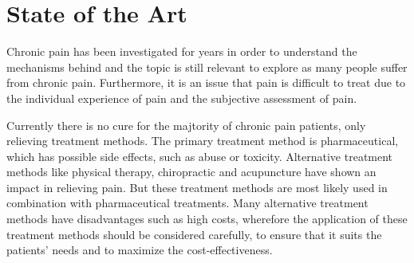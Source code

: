 \section{State of the Art} \label{sec:SOTA}




Chronic pain has been investigated for years in order to understand the mechanisms behind and the topic is still relevant to explore as many people suffer from chronic pain. Furthermore, it is an issue that pain is difficult to treat due to the individual experience of pain and the subjective assessment of pain. \cite{Briggs2010,Norton1999}

Currently there is no cure for the majtority of chronic pain patients, only relieving treatment methods. The primary treatment method is pharmaceutical, which has possible side effects, such as abuse or toxicity. Alternative treatment methods like physical therapy, chiropractic and acupuncture have shown an impact in relieving pain.  But these treatment methods are most likely used in combination with pharmaceutical treatments. Many alternative treatment methods have disadvantages such as high costs, wherefore the application of these treatment methods should be considered carefully, to ensure that it suits the patients’ needs and to maximize the cost-effectiveness. \cite{marcus2009,pope2017}

